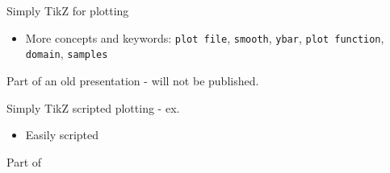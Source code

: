 \documentclass[aspectratio=169]{beamer}
\begin{document}
\begin{frame}{Simply TikZ for plotting}
\begin{center}
      \end{center}
      
      \vspace{-20pt}
      
      \begin{itemize}
          \item More concepts and keywords: \texttt{plot file}, \texttt{smooth}, \texttt{ybar}, \texttt{plot function}, \texttt{domain}, \texttt{samples}
      \end{itemize}
      
      \small Part of an old presentation - will not be published.
      
\end{frame}

\begin{frame}{Simply TikZ scripted plotting - ex.}
    
    \vspace{-15pt}
    
    \begin{center}
        
    \end{center}
    
    \vspace{-15pt}
    
    \begin{itemize}
        \item Easily scripted
    \end{itemize}
    {\footnotesize 
    Part of 
    }
            
\end{frame}
\end{document}
